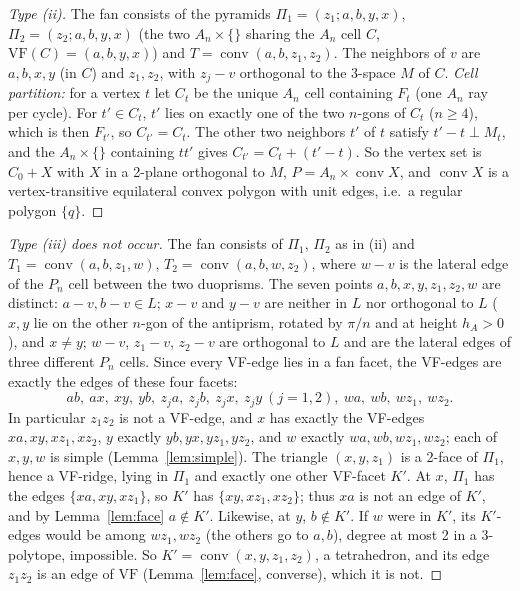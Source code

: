 \documentclass[11pt]{article}
\theoremstyle{definition}
\theoremstyle{remark}
\newcommand{\VF}{\mathrm{VF}}
\newcommand{\conv}{\operatorname{conv}}
\begin{document}
\begin{proof}[Type (ii)]
The fan consists of the pyramids $\Pi_1=(z_1;a,b,y,x)$,
$\Pi_2=(z_2;a,b,y,x)$ (the two $A_n\times\{\}$ sharing the $A_n$ cell $C$,
$\VF(C)=(a,b,y,x)$) and $T=\conv(a,b,z_1,z_2)$. The neighbors of $v$ are
$a,b,x,y$ (in $C$) and $z_1,z_2$, with $z_j-v$ orthogonal to the
3-space $M$ of $C$. \emph{Cell partition:} for a vertex $t$ let $C_t$ be
the unique $A_n$ cell containing $F_t$ (one $A_n$ ray per cycle). For
$t'\in C_t$, $t'$ lies on exactly one of the two $n$-gons of $C_t$ ($n\ge4$),
which is then $F_{t'}$, so $C_{t'}=C_t$. The other two neighbors $t'$ of
$t$ satisfy $t'-t\perp M_t$, and the $A_n\times\{\}$ containing $tt'$ gives
$C_{t'}=C_t+(t'-t)$. So the vertex set is $C_0+X$ with $X$ in a 2-plane
orthogonal to $M$, $P=A_n\times\conv X$, and $\conv X$ is a
vertex-transitive equilateral convex polygon with unit edges, i.e.\ a
regular polygon $\{q\}$.
\end{proof}

\begin{proof}[Type (iii) does not occur]
The fan consists of $\Pi_1$, $\Pi_2$ as in (ii) and $T_1=\conv(a,b,z_1,w)$,
$T_2=\conv(a,b,w,z_2)$, where $w-v$ is the lateral edge of the $P_n$ cell
between the two duoprisms. The seven points $a,b,x,y,z_1,z_2,w$ are
distinct: $a-v,b-v\in L$; $x-v$ and $y-v$ are neither in $L$ nor orthogonal
to $L$ ($x,y$ lie on the other $n$-gon of the antiprism, rotated by $\pi/n$
and at height $h_A>0$), and $x\ne y$; $w-v$, $z_1-v$, $z_2-v$ are orthogonal
to $L$ and are the lateral edges of three different $P_n$ cells. Since
every VF-edge lies in a fan facet, the VF-edges are exactly the edges of
these four facets:
\[ab,\ ax,\ xy,\ yb,\ z_ja,\ z_jb,\ z_jx,\ z_jy\ (j=1,2),\ wa,\ wb,\ wz_1,\ wz_2.\]
In particular $z_1z_2$ is not a VF-edge, and $x$ has exactly the VF-edges
$xa,xy,xz_1,xz_2$, $y$ exactly $yb,yx,yz_1,yz_2$, and $w$ exactly
$wa,wb,wz_1,wz_2$; each of $x,y,w$ is simple (Lemma~\ref{lem:simple}). The
triangle $(x,y,z_1)$ is a 2-face of $\Pi_1$, hence a VF-ridge, lying in
$\Pi_1$ and exactly one other VF-facet $K'$. At $x$, $\Pi_1$ has the edges
$\{xa,xy,xz_1\}$, so $K'$ has $\{xy,xz_1,xz_2\}$; thus $xa$ is not an edge of
$K'$, and by Lemma~\ref{lem:face} $a\notin K'$. Likewise, at $y$, $b\notin
K'$. If $w$ were in $K'$, its $K'$-edges would be among $wz_1,wz_2$ (the
others go to $a,b$), degree at most 2 in a 3-polytope, impossible. So
$K'=\conv(x,y,z_1,z_2)$, a tetrahedron, and its edge $z_1z_2$ is an edge of
$\VF$ (Lemma~\ref{lem:face}, converse), which it is not.
\end{proof}
\end{document}
